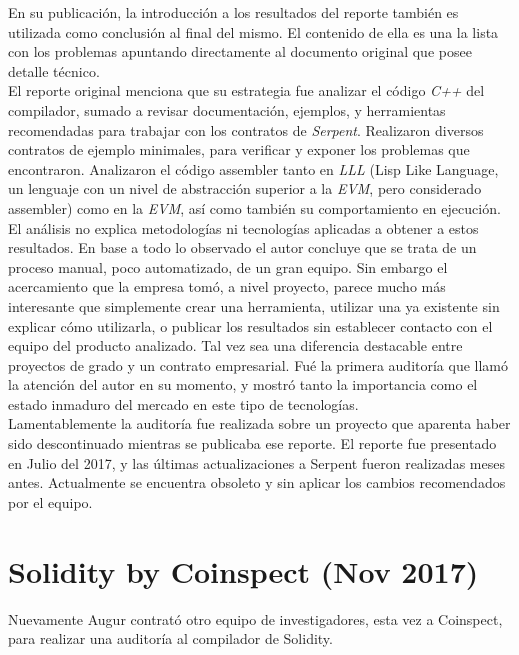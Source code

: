 En su publicación\cite{SerpentCompilerAuditZep}, la introducción a los resultados del reporte también es utilizada como conclusión al final del mismo. El contenido de ella es una la lista con los problemas apuntando directamente al documento original que posee detalle técnico.\\

El reporte original menciona que su estrategia fue analizar el código \textit{C++} del compilador, sumado a revisar documentación, ejemplos, y herramientas recomendadas para trabajar con los contratos de \textit{Serpent}. Realizaron diversos contratos de ejemplo minimales, para verificar y exponer los problemas que encontraron. Analizaron el código assembler tanto en \textit{LLL} (Lisp Like Language, un lenguaje con un nivel de abstracción superior a la \textit{EVM}, pero considerado assembler) como en la \textit{EVM}, así como también su comportamiento en ejecución.\\

El análisis no explica metodologías ni tecnologías aplicadas a obtener a estos resultados. En base a todo lo observado el autor concluye que se trata de un proceso manual, poco automatizado, de un gran equipo. Sin embargo el acercamiento que la empresa tomó, a nivel proyecto, parece mucho más interesante que simplemente crear una herramienta, utilizar una ya existente sin explicar cómo utilizarla, o publicar los resultados sin establecer contacto con el equipo del producto analizado. Tal vez sea una diferencia destacable entre proyectos de grado y un contrato empresarial.
Fué la primera auditoría que llamó la atención del autor en su momento, y mostró tanto la importancia como el estado inmaduro del mercado en este tipo de tecnologías.\\ 

Lamentablemente la auditoría fue realizada sobre un proyecto que aparenta haber sido descontinuado mientras se publicaba ese reporte. El reporte fue presentado en Julio del 2017, y las últimas actualizaciones a Serpent fueron realizadas meses antes. Actualmente se encuentra obsoleto y sin aplicar los cambios recomendados por el equipo.


\section{Solidity by Coinspect (Nov 2017)}
Nuevamente Augur contrató otro equipo de investigadores, esta vez a Coinspect, para realizar una auditoría al compilador de Solidity.\\

